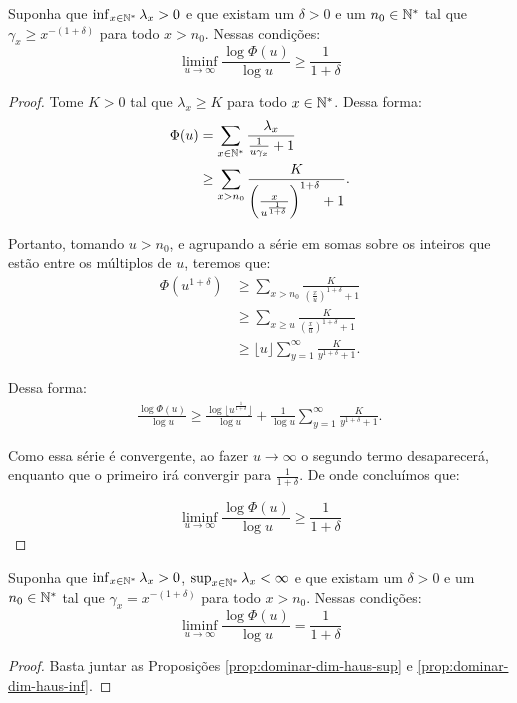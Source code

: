 \begin{proposicao}
\label{prop:dominar-dim-haus-inf}
  Suponha que $\inf_{x\in{\mathbb{N^*}}}\lambda_x  > 0$ e que existam um
  $\delta>0$ e um $n_0 \in {\mathbb{N^*}}$ tal que $\gamma_x \geq x^{-(1+\delta)}$
  para todo $x > n_0$. Nessas condições:
  \begin{equation}
    \liminf_{u \to \infty} \frac{\log \Phi(u)}{\log u}  \geq \frac{1}{1+\delta}
  \end{equation}
\end{proposicao}

\begin{proof}
  Tome $K > 0$ tal que $\lambda_x \geq K$ para todo $x \in {\mathbb{N^*}}$. Dessa
  forma:
  \begin{align*}
    \Phi(u) &= \sum_{x \in {\mathbb{N^*}}} \frac{\lambda_x}{\frac{1}{u\gamma_x} +
      1}\\
    &\geq \sum_{x > n_0}
    \frac{K}{\left(\frac{x}{u^{\frac{1}{1+\delta}}}\right)^{1+\delta} +1}.
  \end{align*}

  Portanto, tomando $u > n_0$, e agrupando a série em somas sobre os inteiros
  que estão entre os múltiplos de $u$, teremos que:
  \begin{align*}
    \Phi(u^{1+\delta}) 
    &\geq \sum_{x > n_0}
    \frac{K}{\left(\frac{x}{u}\right)^{1+\delta} +1}\\
    &\geq \sum_{x \geq u}
    \frac{K}{\left(\frac{x}{u}\right)^{1+\delta} +1}\\
    &\geq \lfloor u \rfloor \sum_{y = 1}^{\infty}
    \frac{K}{y^{1+\delta} + 1}.
  \end{align*}

  Dessa forma:
  \begin{align*}
    \frac{\log \Phi(u)}{\log u} \geq \frac{\log\lfloor
      u^{\frac{1}{1+\delta}} \rfloor }{\log u} + 
    \frac{1}{\log u} \sum_{y = 1}^{\infty}
    \frac{K}{y^{1+\delta} + 1}.
  \end{align*}

  Como essa série é convergente, ao fazer $u \to \infty$ o segundo
  termo desaparecerá, enquanto que o primeiro irá convergir para
  $\frac{1}{1+\delta}$. De onde concluímos que:

  \begin{displaymath}
    \liminf_{u \to \infty} \frac{\log \Phi (u)}{\log u} \geq \frac{1}{1+\delta}
  \end{displaymath}
\end{proof}

\begin{corolario}
  \label{prop:igualar-dim-haus}
  Suponha que $\inf_{x \in {\mathbb{N^*}}} \lambda_x > 0$, $\sup_{x \in {\mathbb{N^*}}}
  \lambda_x < \infty$ e que existam um $\delta > 0$ e um $n_0 \in {\mathbb{N^*}}$
  tal que $\gamma_x = x^{-(1+\delta)}$ para todo $x > n_0$.  Nessas
  condições:
  \begin{displaymath}
    \liminf_{u \to \infty} \frac{\log \Phi(u)}{\log u} = \frac{1}{1+\delta}
  \end{displaymath}
\end{corolario}
\begin{proof}
  Basta juntar as Proposições \ref{prop:dominar-dim-haus-sup} e
  \ref{prop:dominar-dim-haus-inf}.
\end{proof}

